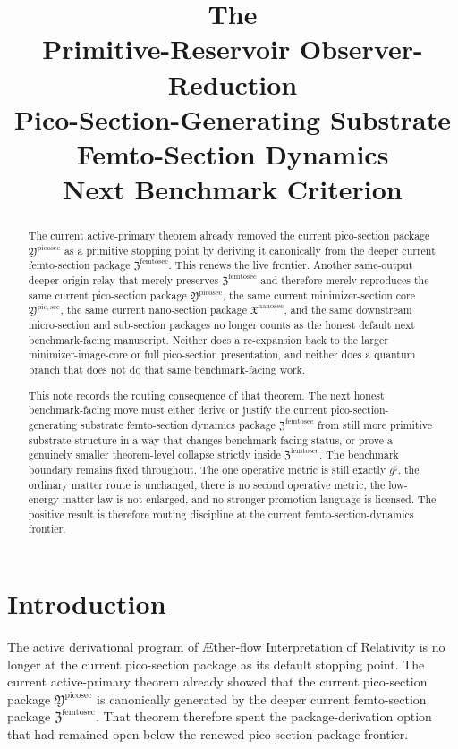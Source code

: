 \documentclass[11pt]{article}
\title{\textbf{The \TheoryName{}}\\[0.4em]
\large Primitive-Reservoir Observer-Reduction\\
\large Pico-Section-Generating Substrate Femto-Section Dynamics\\
\large Next Benchmark Criterion}
\author{}
\date{}
\newcommand{\Aflow}{\AE{}ther-flow}
\newcommand{\TheoryName}{\Aflow{} Interpretation of Relativity}
\newcommand{\CompletedMetric}{g^{\sharp}}
\newcommand{\NanoSectionPackage}{\mathfrak X^{\mathrm{nanosec}}}
\newcommand{\PicoSectionPackage}{\mathfrak Y^{\mathrm{picosec}}}
\newcommand{\PicoMinSectionCore}{\mathfrak Y^{\mathrm{pic,sec}}}
\newcommand{\FemtoSectionPackage}{\mathfrak Z^{\mathrm{femtosec}}}
\begin{document}
\maketitle

\begin{abstract}
The current active-primary theorem already removed the current pico-section package \(\PicoSectionPackage\) as a primitive stopping point by deriving it canonically from the deeper current femto-section package \(\FemtoSectionPackage\). This renews the live frontier. Another same-output deeper-origin relay that merely preserves \(\FemtoSectionPackage\) and therefore merely reproduces the same current pico-section package \(\PicoSectionPackage\), the same current minimizer-section core \(\PicoMinSectionCore\), the same current nano-section package \(\NanoSectionPackage\), and the same downstream micro-section and sub-section packages no longer counts as the honest default next benchmark-facing manuscript. Neither does a re-expansion back to the larger minimizer-image-core or full pico-section presentation, and neither does a quantum branch that does not do that same benchmark-facing work.

This note records the routing consequence of that theorem. The next honest benchmark-facing move must either derive or justify the current pico-section-generating substrate femto-section dynamics package \(\FemtoSectionPackage\) from still more primitive substrate structure in a way that changes benchmark-facing status, or prove a genuinely smaller theorem-level collapse strictly inside \(\FemtoSectionPackage\). The benchmark boundary remains fixed throughout. The one operative metric is still exactly \(\CompletedMetric\), the ordinary matter route is unchanged, there is no second operative metric, the low-energy matter law is not enlarged, and no stronger promotion language is licensed. The positive result is therefore routing discipline at the current femto-section-dynamics frontier.
\end{abstract}

\section{Introduction}

The active derivational program of \TheoryName{} is no longer at the current pico-section package as its default stopping point. The current active-primary theorem already showed that the current pico-section package \(\PicoSectionPackage\) is canonically generated by the deeper current femto-section package \(\FemtoSectionPackage\). That theorem therefore spent the package-derivation option that had remained open below the renewed pico-section-package frontier.
\end{document}
